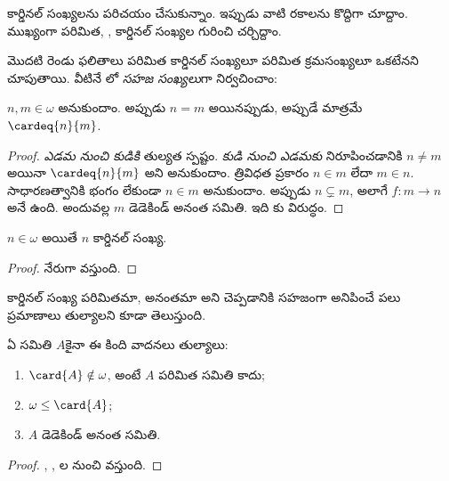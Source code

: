 \documentclass[../../../include/open-logic-section]{subfiles}
\begin{document}

కార్డినల్ సంఖ్యలను పరిచయం చేసుకున్నాం. ఇప్పుడు వాటి రకాలను
కొద్దిగా చూద్దాం. ముఖ్యంగా పరిమిత, ,
 కార్డినల్ సంఖ్యల గురించి చర్చిద్దాం.

మొదటి రెండు ఫలితాలు పరిమిత కార్డినల్ సంఖ్యలూ పరిమిత
క్రమసంఖ్యలూ ఒకటేనని చూపుతాయి. వీటినే
లో \emph{సహజ సంఖ్యలు}గా నిర్వచించాం:

\begin{prop}
$n, m \in \omega$ అనుకుందాం. అప్పుడు $n = m$ అయినప్పుడు, అప్పుడే మాత్రమే $\cardeq{n}{m}$.
\end{prop}

\begin{proof}
\emph{ఎడమ నుంచి కుడికి} తుల్యత స్పష్టం. \emph{కుడి నుంచి ఎడమకు} నిరూపించడానికి $n \neq m$ అయినా $\cardeq{n}{m}$ అని అనుకుందాం. త్రివిధత ప్రకారం $n \in m$ లేదా $m \in n$. సాధారణత్వానికి భంగం లేకుండా $n \in m$ అనుకుందాం. అప్పుడు $n \subsetneq m$, అలాగే $f \colon m \to n$ అనే  ఉంది. అందువల్ల $m$ డెడెకిండ్ అనంత సమితి. ఇది కు విరుద్ధం.
\end{proof}

\begin{cor}
$n \in \omega$ అయితే $n$ కార్డినల్ సంఖ్య.
\end{cor}

\begin{proof}
నేరుగా వస్తుంది.
\end{proof}
\noindent
కార్డినల్ సంఖ్య పరిమితమా, అనంతమా అని చెప్పడానికి సహజంగా అనిపించే పలు ప్రమాణాలు తుల్యాలని కూడా తెలుస్తుంది.
\begin{thm}ఏ సమితి $A$కైనా ఈ కింది వాదనలు తుల్యాలు:
\begin{enumerate}
	\item{} $\card{A} \notin \omega$, అంటే $A$ పరిమిత సమితి కాదు;
	\item{} $\omega \leq \card{A}$;
	\item{} $A$ డెడెకిండ్ అనంత సమితి.
\end{enumerate}
\end{thm}

\begin{proof}
, , ల నుంచి వస్తుంది.
\end{proof}
\end{document}
